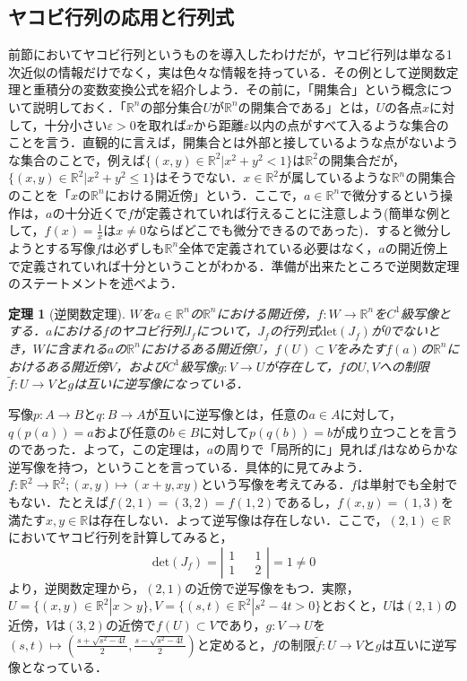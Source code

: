 \documentclass{jsarticle}
\def\detb{\left|\begin{matrix}}
\def\dete{\end{matrix}\right|}
\def\realnum{{\mathbb R}}
\def\det{{\mathrm{det}}}
\newtheorem{theo}{定理}
\begin{document}
\subsection{ヤコビ行列の応用と行列式}
前節においてヤコビ行列というものを導入したわけだが，ヤコビ行列は単なる1次近似の情報だけでなく，実は色々な情報を持っている．その例として逆関数定理と重積分の変数変換公式を紹介しよう．その前に，「開集合」という概念について説明しておく．「$\realnum^n$の部分集合$U$が$\realnum^n$の開集合である」とは，$U$の各点$x$に対して，十分小さい$\varepsilon>0$を取れば$x$から距離$\varepsilon$以内の点がすべて入るような集合のことを言う．直観的に言えば，開集合とは外部と接しているような点がないような集合のことで，例えば$\{(x,y)\in\realnum^2|x^2+y^2<1\}$は$\realnum^2$の開集合だが，$\{(x,y)\in\realnum^2|x^2+y^2\le1\}$はそうでない．$x\in\realnum^2$が属しているような$\realnum^n$の開集合のことを「$x$の$\realnum^n$における開近傍」という．ここで，$a\in\realnum^n$で微分するという操作は，$a$の十分近くで$f$が定義されていれば行えることに注意しよう(簡単な例として，$f(x)=\frac{1}{x}$は$x\neq0$ならばどこでも微分できるのであった)．すると微分しようとする写像$f$は必ずしも$\realnum^n$全体で定義されている必要はなく，$a$の開近傍上で定義されていれば十分ということがわかる．準備が出来たところで逆関数定理のステートメントを述べよう．
\begin{theo}[逆関数定理]
$W$を$a\in\realnum^n$の$\realnum^n$における開近傍，$f:W\rightarrow\realnum^n$を$C^1$級写像とする．$a$における$f$のヤコビ行列$J_f$について，$J_f$の行列式$\det(J_f)$が0でないとき，$W$に含まれる$a$の$\realnum^n$におけるある開近傍$U$，$f(U)\subset V$をみたす$f(a)$の$\realnum^n$におけるある開近傍$V$，および$C^1$級写像$g:V\rightarrow U$が存在して，$f$の$U,V$への制限$\tilde{f}:U\rightarrow V$と$g$は互いに逆写像になっている．
\end{theo}
写像$p:A\rightarrow B$と$q:B\rightarrow A$が互いに逆写像とは，任意の$a\in A$に対して，$q(p(a))=a$および任意の$b\in B$に対して$p(q(b))=b$が成り立つことを言うのであった．よって，この定理は，$a$の周りで「局所的に」見れば$f$はなめらかな逆写像を持つ，ということを言っている．具体的に見てみよう．$f:\realnum^2\rightarrow\realnum^2;(x,y)\mapsto(x+y,xy)$という写像を考えてみる．$f$は単射でも全射でもない．たとえば$f(2,1)=(3,2)=f(1,2)$であるし，$f(x,y)=(1,3)$を満たす$x,y\in\realnum$は存在しない．よって逆写像は存在しない．ここで，$(2,1)\in\realnum$においてヤコビ行列を計算してみると，
$$
\det(J_f)=\detb 1 && 1 \\ 1&& 2 \dete = 1\neq 0
$$
より，逆関数定理から，$(2,1)$の近傍で逆写像をもつ．実際，$U=\{(x,y)\in\realnum^2|x>y\},V=\{(s,t)\in\realnum^2|s^2-4t>0\}$とおくと，$U$は$(2,1)$の近傍，$V$は$(3,2)$の近傍で$f(U)\subset V$であり，$g:V\rightarrow U$を$(s,t)\mapsto(\frac{s+\sqrt{s^2-4t}}{2},\frac{s-\sqrt{s^2-4t}}{2})$と定めると，$f$の制限$\tilde{f}:U\rightarrow V$と$g$は互いに逆写像となっている．
\end{document}
